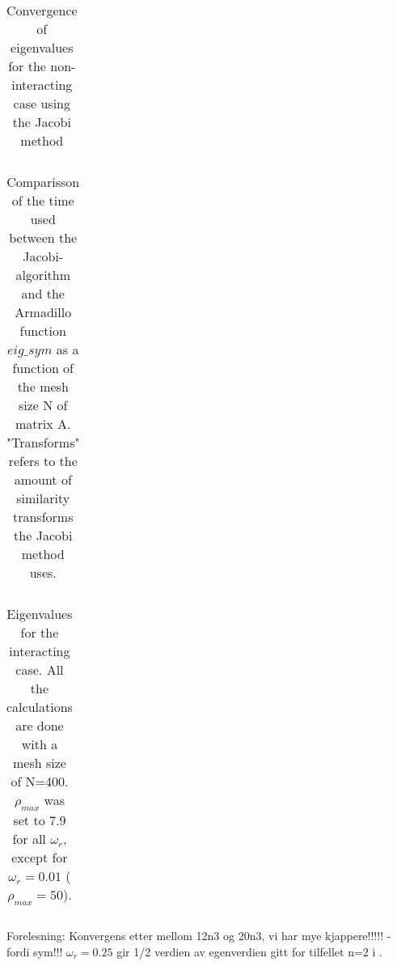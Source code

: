 
\begin{table}[H]\caption{Convergence of eigenvalues for the non-interacting case using the Jacobi method}
	\label{tab:eigval}
	\begin{tabular}{cccc}
		
	\end{tabular}
\end{table}


\begin{table}[H]\caption{Comparisson of the time used between the Jacobi-algorithm and the Armadillo function  $eig\_sym$ as a function of the mesh size N of matrix A. "Transforms" refers to the amount of similarity transforms the Jacobi method uses.}
	\label{tab:time}
	\begin{tabular}{cccccc}
		
	\end{tabular}
\end{table}




\begin{table}[H]\caption{Eigenvalues for the interacting case. All the calculations are done with a mesh size of N=400. $ \rho_{max} $ was set to $ 7.9 $ for all $ \omega_r $, except for $ \omega_r  = 0.01$ ( $ \rho_{max} =50$). }
	\label{tab:omega}
	\begin{tabular}{cccc}
		
	\end{tabular}
\end{table}

Forelesning: Konvergens etter mellom 12n3 og 20n3, vi har mye kjappere!!!!! - fordi sym!!!
$ \omega_r= 0.25 $ gir 1/2 verdien av egenverdien gitt for tilfellet n=2 i \cite{litterature}. 